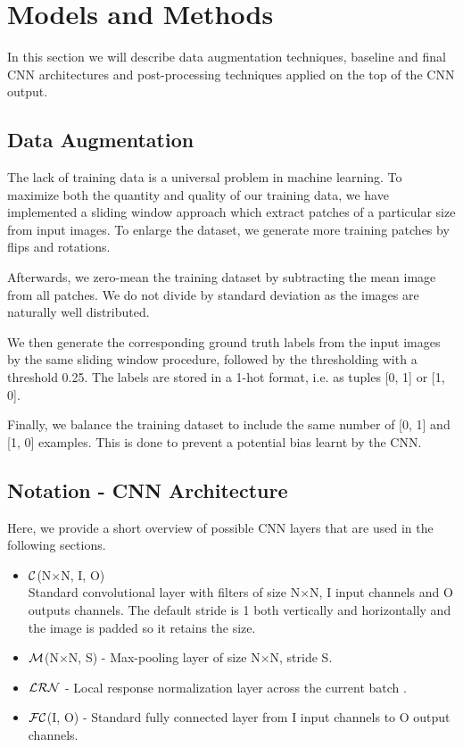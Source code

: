 \documentclass[10pt,conference,compsocconf]{IEEEtran}
\newcommand{\conv}[3]{$ \cal{C} $(#1$ \times  $#1, #2, #3)}
\newcommand{\maxpool}[2]{$ \cal{M} $(#1$ \times $#1, #2)}
\newcommand{\lrn}{$ \cal{LRN}~$}
\newcommand{\fc}[2]{$ \cal{FC} $(#1, #2)}
\begin{document}
\section{Models and Methods}
\label{sec:MM}
In this section we will describe data augmentation techniques, baseline and final CNN architectures and post-processing techniques applied on the top of the CNN output.

\subsection{Data Augmentation}
\label{subsec:preprocessing}
The lack of training data is a universal problem in machine learning. To maximize both the quantity and quality of our training data, we have implemented a sliding window approach which extract patches of a particular size from input images. To enlarge the dataset, we generate more training patches by flips and rotations.

Afterwards, we zero-mean the training dataset by subtracting the mean image from all patches. We do not divide by standard deviation as the images are naturally well distributed.

We then generate the corresponding ground truth labels from the input images by the same sliding window procedure, followed by the thresholding with a threshold 0.25. The labels are stored in a 1-hot format, i.e. as tuples [0, 1] or [1, 0].

Finally, we balance the training dataset to include the same number of [0, 1] and [1, 0] examples. This is done to prevent a potential bias learnt by the CNN.

\subsection{Notation - CNN Architecture}
Here, we provide a short overview of possible CNN layers that are used in the following sections.
\begin{itemize}
	\item \conv{N}{I}{O} \\
	Standard convolutional layer with filters of size N$ \times $N, I input channels and O outputs channels. The default stride is 1 both vertically and horizontally and the image is padded so it retains the size.
	\item \maxpool{N}{S} - Max-pooling layer of size N$ \times $N, stride S.
	\item \lrn - Local response normalization layer across the current batch \cite{tensorflow.2015}.
	\item \fc{I}{O} - Standard fully connected layer from I input channels to O output channels.
\end{itemize}
\end{document}
